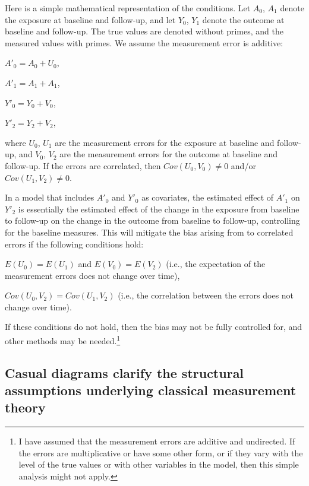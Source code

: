 \documentclass[
  singlecolumn]{report}
\begin{document}
Here is a simple mathematical representation of the conditions. Let
\(A_0\), \(A_1\) denote the exposure at baseline and follow-up, and let
\(Y_0\), \(Y_1\) denote the outcome at baseline and follow-up. The true
values are denoted without primes, and the measured values with primes.
We assume the measurement error is additive:

\(A'_0 = A_0 + U_0\),

\(A'_1 = A_1 + A_1\),

\(Y'_0 = Y_0 + V_0\),

\(Y'_2 = Y_2 + V_2\),

where \(U_0\), \(U_1\) are the measurement errors for the exposure at
baseline and follow-up, and \(V_0\), \(V_2\) are the measurement errors
for the outcome at baseline and follow-up. If the errors are correlated,
then \(Cov(U_0, V_0) \neq 0\) and/or \(Cov(U_1, V_2) \neq 0\).

In a model that includes \(A'_0\) and \(Y'_0\) as covariates, the
estimated effect of \(A'_1\) on \(Y'_2\) is essentially the estimated
effect of the change in the exposure from baseline to follow-up on the
change in the outcome from baseline to follow-up, controlling for the
baseline measures. This will mitigate the bias arising from to
correlated errors if the following conditions hold:

\(E(U_0) = E(U_1)\) and \(E(V_0) = E(V_2)\) (i.e., the expectation of
the measurement errors does not change over time),

\(Cov(U_0, V_2) = Cov(U_1, V_2)\) (i.e., the correlation between the
errors does not change over time).

If these conditions do not hold, then the bias may not be fully
controlled for, and other methods may be needed.\footnote{I have assumed
  that the measurement errors are additive and undirected. If the errors
  are multiplicative or have some other form, or if they vary with the
  level of the true values or with other variables in the model, then
  this simple analysis might not apply.}

\hypertarget{casual-diagrams-clarify-the-structural-assumptions-underlying-classical-measurement-theory}{%
\subsection{Casual diagrams clarify the structural assumptions
underlying classical measurement
theory}\label{casual-diagrams-clarify-the-structural-assumptions-underlying-classical-measurement-theory}}
\end{document}

